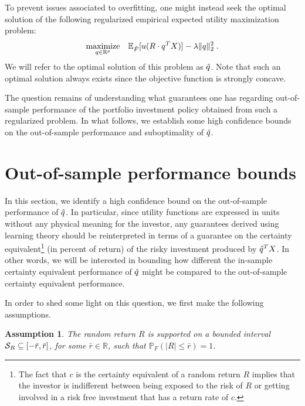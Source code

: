 \documentclass[]{interact}
\theoremstyle{plain}%
\theoremstyle{definition}
\theoremstyle{remark}
\def\Expect{{\mathbb E}}
\def\Prob{{\mathbb P}}
\def\maximize{\mathop{\rm maximize}}
\newcommand{\0}{\V{0}}
\newcommand{\1}{\V{1}}
\renewcommand{\Re}{\mathbb{R}}
\newcommand{\modified}[1]{{\color{blue} #1}}
\theoremstyle{plain}
\newtheorem{assumption}{Assumption}
\theoremstyle{definition}
\begin{document}
To prevent issues associated to overfitting, one might instead seek the optimal solution
of the following regularized empirical expected utility maximization problem:
\begin{equation}
\maximize_{q\in\Re^p}\;\;\;\Expect_\Fhat[u(R\cdot q^TX)]-\lambda\|q\|_2^2\;.\label{EUFhatReg}
\end{equation}
We will refer to the optimal solution of this problem as ${\hat{q}}$. \modified{Note that such an optimal solution always exists since the objective function is strongly concave.}

The question remains of understanding what guarantees \modified{one has} regarding out-of-sample performance of the portfolio investment policy obtained from such a regularized
problem. In what follows, we establish some high confidence bounds on the out-of-sample performance and suboptimality of ${\hat{q}}$.

%
\section{Out-of-sample performance bounds}\label{sec:oos}

In this section, we identify a high confidence bound on the out-of-sample performance of ${\hat{q}}$. In particular, since utility functions are expressed in units without any
physical meaning for the investor, any guarantees derived using learning theory should be
reinterpreted in terms of a guarantee on the certainty equivalent\footnote{The fact that
  $c$ is the certainty equivalent of a random return $R$ implies that the  \modified{investor is}
  indifferent between being exposed to the risk of $R$ or getting involved in a risk free
  investment that has a return rate of $c$.} (in percent of return) of the risky
investment produced by ${\hat{q}}^T X$. In other words, we will be interested in bounding how
different the in-sample certainty equivalent performance of ${\hat{q}}$ might be compared to
the out-of-sample certainty equivalent performance. %

In order to shed some light on this question, we first make the following assumptions.

\begin{assumption}\label{ass:R}
\modified{  The random return $R$ is supported on a bounded interval
  ${\mathcal{S}_R}\subseteq [-\bar{r},\bar{r}]$, for some $\bar{r}\in\Re$, such that $\Prob_F(|R|\leq \bar{r})=1$.}
\end{assumption}
\end{document}
